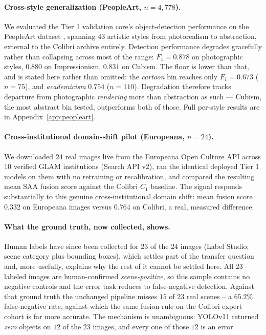 \documentclass[12pt,a4paper]{report}
\begin{document}
\paragraph{Cross-style generalization (PeopleArt, $n=4{,}778$).} We evaluated the Tier 1 validation core's object-detection performance on the PeopleArt dataset \cite{westlake2016}, spanning 43 artistic styles from photorealism to abstraction, external to the Colibri archive entirely. Detection performance degrades gracefully rather than collapsing across most of the range: $F_1=0.878$ on photographic styles, $0.880$ on Impressionism, $0.831$ on Cubism. The floor is lower than that, and is stated here rather than omitted: the \textit{cartoon} bin reaches only $F_1=0.673$ ($n=75$), and \textit{academicism} $0.754$ ($n=110$). Degradation therefore tracks departure from photographic \emph{rendering} more than abstraction as such --- Cubism, the most abstract bin tested, outperforms both of those. Full per-style results are in Appendix~\ref{app:peopleart}.

\paragraph{Cross-institutional domain-shift pilot (Europeana, $n=24$).} We downloaded $24$ real images live from the Europeana Open Culture API across 10 verified GLAM institutions (Search API v2), ran the identical deployed Tier 1 models on them with no retraining or recalibration, and compared the resulting mean SAA fusion score against the Colibri $C_1$ baseline. The signal responds substantially to this genuine cross-institutional domain shift: mean fusion score $0.332$ on Europeana images versus $0.764$ on Colibri, a real, measured difference.

\paragraph{What the ground truth, now collected, shows.} Human labels have since been collected for $23$ of the $24$ images (Label Studio; scene category plus bounding boxes), which settles part of the transfer question and, more usefully, explains why the rest of it cannot be settled here. All $23$ labeled images are human-confirmed \emph{scene-positive}, so this sample contains no negative controls and the error task reduces to false-negative detection. Against that ground truth the unchanged pipeline misses $15$ of $23$ real scenes -- a $65.2\%$ false-negative rate, against which the same fusion rule on the Colibri expert cohort is far more accurate. The mechanism is unambiguous: YOLOv11 returned \emph{zero} objects on $12$ of the $23$ images, and every one of those $12$ is an error.
\end{document}
